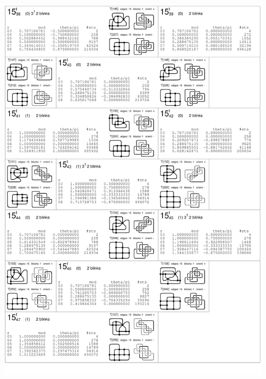 \begin{center}
 \includegraphics[height=23.5cm]{E.figsbw2/con3catalog011_bw.pdf} \eject

\end{center}
